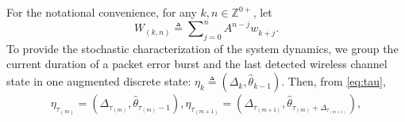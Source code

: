 \documentclass[journal,twoside,web]{ieeecolor}
\begin{document}
For the notational convenience, for any $k,n\in\mathbb{Z}^{0+}$, let
\begin{equation}\label{eq:calPsi}
W_{\!(k,n)} \!\triangleq\! \sum\nolimits_{j=0}^{n}A^{n-j} w_{k+j}^{}.
\end{equation}
To provide the stochastic characterization of the system dynamics, we group the current duration of a packet error burst and the last detected wireless channel state in one augmented discrete state:
$\eta_{k}^{} \!\triangleq\! (\mathit{\Delta}_{k},\hat{\theta}_{k-1})$. Then, from \eqref{eq:tau},
\begin{subequations}\label{eq:etatau}
\begin{equation}
    \eta_{\tau_{(m)}}^{} = (\mathit{\Delta}_{\tau_{(m)}},\hat{\theta}_{\tau_{(m)}-1}),
\end{equation}
\begin{equation}
    \eta_{\tau_{(m+1)}}^{} = (\mathit{\Delta}_{\tau_{(m+1)}},\hat{\theta}_{\tau_{(m)}+\mathit{\Delta}_{\tau_{(m+1)}}}),
\end{equation}
\end{subequations}
\newpage
\end{document}
